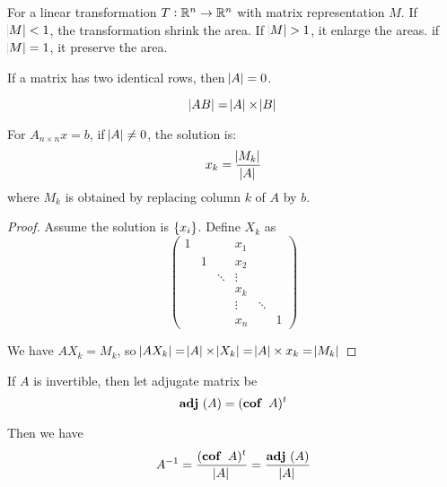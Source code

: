 \begin{theorem}
    For a linear transformation $T: \mathbb{R}^n \rightarrow \mathbb{R}^n$ with matrix representation $M$. If $\abs{M} < 1$, the transformation shrink the area. If $\abs{M} > 1$, it enlarge the areas. if $\abs{M} = 1$, it preserve the area.
\end{theorem}


\begin{theorem}
    If a matrix has two identical rows, then $\abs{A} = 0$.
\end{theorem}


\begin{theorem}
    \begin{equation}
        \abs{AB} = \abs{A} \times \abs{B}
    \end{equation}    
\end{theorem}


\begin{theorem}
    For $A_{n \times n}x=b$, if $\abs{A} \neq 0$, the solution is:
    \begin{equation}
        x_k = \frac{\abs{M_k}}{\abs{A}}
    \end{equation}
    where $M_k$ is obtained by replacing column $k$ of $A$ by $b$.
\end{theorem}
\begin{proof}
    Assume the solution is $\set{x_i}$. Define $X_k$ as 
    \begin{equation*}
        \begin{pmatrix}
        1 &   &   & x_1 &  \\
          & 1 &   & x_2 &  \\
          &   & \ddots & \vdots \\
          &   &        &  x_k & \\
          &&& \vdots & \ddots \\
          &&& x_n & & 1          
        \end{pmatrix}
    \end{equation*}
    
    We have $A X_k = M_k$, so $\abs{A X_k} = \abs{A} \times \abs{X_k} = \abs{A} \times x_k = \abs{M_k}$
\end{proof}

\begin{theorem}
    If $A$ is invertible, then let adjugate matrix be
    \begin{equation}
        \adjugate{A} = (\cofactor{A})^t
    \end{equation}
    
    Then we have
    \begin{equation}
        \inverse{A} = \frac{(\cofactor{A})^t}{\determinate{A}} = \frac{\adjugate{A}}{\determinate{A}}
    \end{equation}
\end{theorem}


